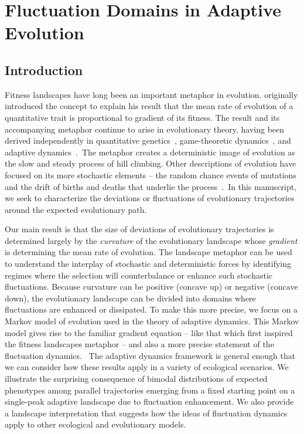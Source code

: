 

\chapter{Fluctuation Domains in Adaptive Evolution}

\section{Introduction}
Fitness landscapes have long been an important metaphor in evolution.
\citet{Wright31} originally introduced the concept to explain his
result that the mean rate of evolution of a quantitative trait
is proportional to gradient of its fitness. The result and its
accompanying metaphor continue to arise in evolutionary theory, having
been derived independently in quantitative genetics~\citep{Lande79},
game-theoretic dynamics~\citep{hofbauer_book1998, Abrams93}, and
adaptive dynamics~\citep{dieckmann_jmb1996}. The metaphor creates a
deterministic image of evolution as the slow and steady process of hill
climbing. Other descriptions of evolution have focused on its more
stochastic elements -- the random chance events of mutations and the drift
of births and deaths that underlie the process~\citep{kimura_book1984,
kimura1968, ohta_pnas2002}. In this manuscript, we seek to characterize
the deviations or fluctuations of evolutionary trajectories around the
expected evolutionary path.

Our main result is that the size of deviations of evolutionary
trajectories is determined largely by the \emph{curvature} of the
evolutionary landscape whose \emph{gradient} is determining the mean
rate of evolution. The landscape metaphor can be used to understand
the interplay of stochastic and deterministic forces by identifying
regimes where the selection will counterbalance or enhance such stochastic
fluctuations. Because curvature can be positive (concave up) or negative
(concave down), the evolutionary landscape can be divided into domains
where fluctuations are enhanced or dissipated. To make this more
precise, we focus on a Markov model of evolution used in the theory of
adaptive dynamics. This Markov model gives rise to the familiar gradient
equation -- like that which first inspired the fitness landscapes metaphor
-- and also a more precise statement of the fluctuation dynamics.  The
adaptive dynamics framework is general enough that we can consider how
these results apply in a variety of ecological scenarios.  We illustrate
the surprising consequence of bimodal distributions of expected
phenotypes among parallel trajectories emerging from a fixed starting
point on a single-peak adaptive landscape due to fluctuation enhancement.
We also provide a landscape interpretation that suggests how the ideas
of fluctuation dynamics apply to other ecological and evolutionary models.

